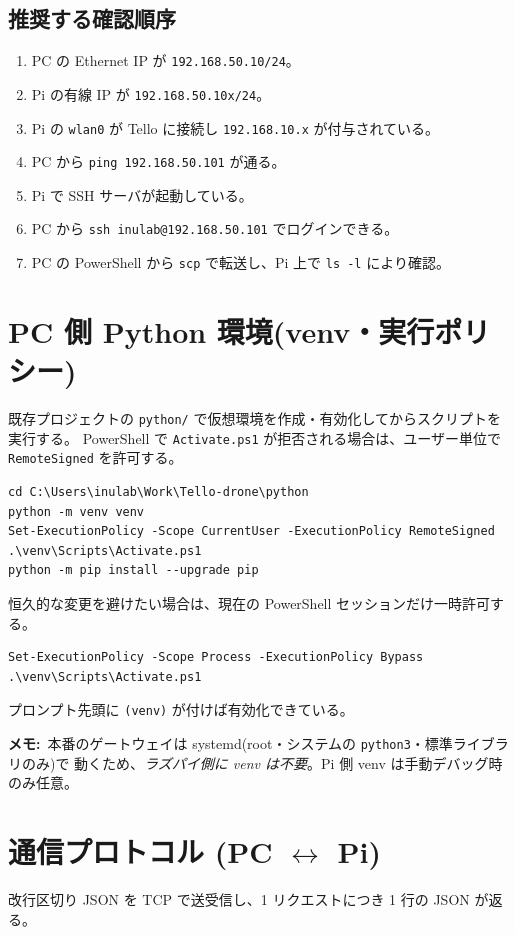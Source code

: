 \documentclass[11pt,a4paper]{ltjsarticle}
\newcommand{\code}[1]{\texttt{\small #1}}
\newcommand{\note}[1]{\par\smallskip\noindent\textbf{メモ:}~#1\par\smallskip}
\begin{document}
\subsection{推奨する確認順序}
\begin{enumerate}[leftmargin=1.6em]
  \item PC の Ethernet IP が \code{192.168.50.10/24}。
  \item Pi の有線 IP が \code{192.168.50.10x/24}。
  \item Pi の \code{wlan0} が Tello に接続し \code{192.168.10.x} が付与されている。
  \item PC から \code{ping 192.168.50.101} が通る。
  \item Pi で SSH サーバが起動している。
  \item PC から \code{ssh inulab@192.168.50.101} でログインできる。
  \item PC の PowerShell から \code{scp} で転送し、Pi 上で \code{ls -l} により確認。
\end{enumerate}

\section{PC 側 Python 環境(venv・実行ポリシー)}
既存プロジェクトの \code{python/} で仮想環境を作成・有効化してからスクリプトを実行する。
PowerShell で \code{Activate.ps1} が拒否される場合は、ユーザー単位で \code{RemoteSigned} を許可する。
\begin{lstlisting}
cd C:\Users\inulab\Work\Tello-drone\python
python -m venv venv
Set-ExecutionPolicy -Scope CurrentUser -ExecutionPolicy RemoteSigned
.\venv\Scripts\Activate.ps1
python -m pip install --upgrade pip
\end{lstlisting}
恒久的な変更を避けたい場合は、現在の PowerShell セッションだけ一時許可する。
\begin{lstlisting}
Set-ExecutionPolicy -Scope Process -ExecutionPolicy Bypass
.\venv\Scripts\Activate.ps1
\end{lstlisting}
プロンプト先頭に \code{(venv)} が付けば有効化できている。

\note{本番のゲートウェイは systemd(root・システムの \code{python3}・標準ライブラリのみ)で
動くため、\emph{ラズパイ側に venv は不要}。Pi 側 venv は手動デバッグ時のみ任意。}

\section{通信プロトコル (PC $\leftrightarrow$ Pi)}
改行区切り JSON を TCP で送受信し、1 リクエストにつき 1 行の JSON が返る。
\end{document}
